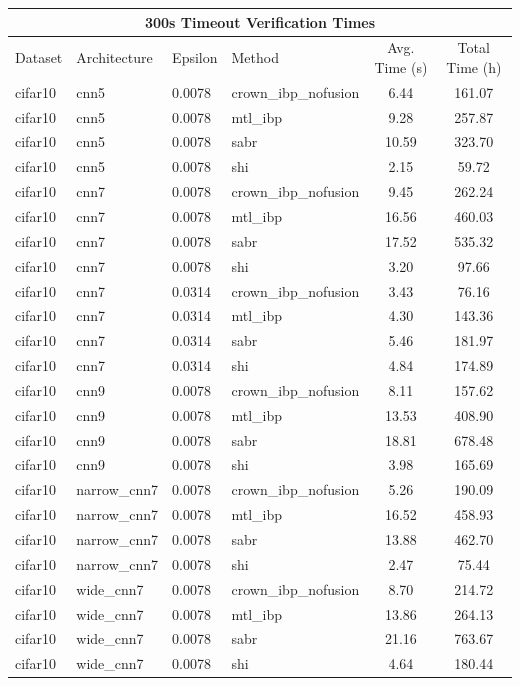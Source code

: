 \begin{tabular}{llllcc}
\toprule
\multicolumn{6}{c}{300s Timeout Verification Times} \\
\midrule
Dataset & Architecture & Epsilon & Method & Avg. Time (s) & Total Time (h) \\
\midrule
cifar10 & cnn5 & 0.0078 & crown\_ibp\_nofusion & 6.44 & 161.07 \\
cifar10 & cnn5 & 0.0078 & mtl\_ibp & 9.28 & 257.87 \\
cifar10 & cnn5 & 0.0078 & sabr & 10.59 & 323.70 \\
cifar10 & cnn5 & 0.0078 & shi & 2.15 & 59.72 \\
cifar10 & cnn7 & 0.0078 & crown\_ibp\_nofusion & 9.45 & 262.24 \\
cifar10 & cnn7 & 0.0078 & mtl\_ibp & 16.56 & 460.03 \\
cifar10 & cnn7 & 0.0078 & sabr & 17.52 & 535.32 \\
cifar10 & cnn7 & 0.0078 & shi & 3.20 & 97.66 \\
cifar10 & cnn7 & 0.0314 & crown\_ibp\_nofusion & 3.43 & 76.16 \\
cifar10 & cnn7 & 0.0314 & mtl\_ibp & 4.30 & 143.36 \\
cifar10 & cnn7 & 0.0314 & sabr & 5.46 & 181.97 \\
cifar10 & cnn7 & 0.0314 & shi & 4.84 & 174.89 \\
cifar10 & cnn9 & 0.0078 & crown\_ibp\_nofusion & 8.11 & 157.62 \\
cifar10 & cnn9 & 0.0078 & mtl\_ibp & 13.53 & 408.90 \\
cifar10 & cnn9 & 0.0078 & sabr & 18.81 & 678.48 \\
cifar10 & cnn9 & 0.0078 & shi & 3.98 & 165.69 \\
cifar10 & narrow\_cnn7 & 0.0078 & crown\_ibp\_nofusion & 5.26 & 190.09 \\
cifar10 & narrow\_cnn7 & 0.0078 & mtl\_ibp & 16.52 & 458.93 \\
cifar10 & narrow\_cnn7 & 0.0078 & sabr & 13.88 & 462.70 \\
cifar10 & narrow\_cnn7 & 0.0078 & shi & 2.47 & 75.44 \\
cifar10 & wide\_cnn7 & 0.0078 & crown\_ibp\_nofusion & 8.70 & 214.72 \\
cifar10 & wide\_cnn7 & 0.0078 & mtl\_ibp & 13.86 & 264.13 \\
cifar10 & wide\_cnn7 & 0.0078 & sabr & 21.16 & 763.67 \\
cifar10 & wide\_cnn7 & 0.0078 & shi & 4.64 & 180.44 \\

\end{tabular}
